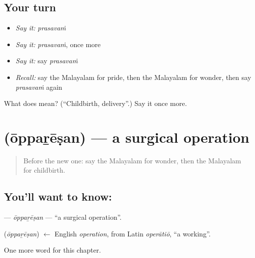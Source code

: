 \subsection*{Your turn}
\begin{itemize}
\raggedright
  \item \emph{Say it:} \emph{prasavaṁ}
  \item \emph{Say it:} \emph{prasavaṁ}, once more
  \item \emph{Say it:} say \emph{prasavaṁ}
  \item \emph{Recall:} say the Malayalam for pride, then the Malayalam for wonder, then say \emph{prasavaṁ} again
\end{itemize}

\begin{tcolorbox}[breakable,colback=teal!4,colframe=teal!35!black,title={Before you move on}]
What does  mean? (\textquotedblleft{}Childbirth, delivery\textquotedblright{}.) Say it once more.
\end{tcolorbox}
\section[\texorpdfstring{\ml{ഓപ്പറേഷൻ} (ōppaṟēṣan)}{ഓപ്പറേഷൻ (ōppaṟēṣan)}]{ (ōppaṟēṣan) — a surgical operation}

\label{lesson:ML-C194-opparesan}



\begin{quote}
Before the new one: say the Malayalam for wonder, then the Malayalam for childbirth.
\end{quote}

\subsection*{You'll want to know: }
\textbf{} — \emph{ōppaṟēṣan} — \textquotedblleft{}a surgical operation\textquotedblright{}.

\begin{cousinweb}
\textbf{} (\emph{ōppaṟēṣan}) $\leftarrow$ English \emph{operation}, from Latin \emph{operātiō}, \textquotedblleft{}a working\textquotedblright{}.
\end{cousinweb}

\begin{grammarlens}[title={What you've built}]
One more word for this chapter.
\end{grammarlens}

